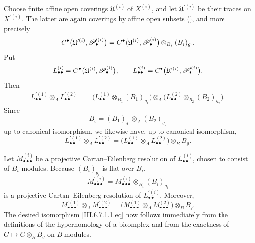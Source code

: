 \begin{env}[6.7.1]

Choose finite affine open coverings $\mathfrak U^{(i)}$ of
$X^{(i)}$, and let $\mathfrak U^{\prime(i)}$ be their traces on
$X^{\prime(i)}$.  The latter are again coverings by affine open
subsets (), and more precisely
\[
  C^\bullet
  \bigl(
    \mathfrak U^{\prime(i)},\mathscr{P}_\bullet^{\prime(i)}
  \bigr)
  =
  C^\bullet
  \bigl(
    \mathfrak U^{(i)},\mathscr{P}_\bullet^{(i)}
  \bigr)
  \otimes_{B_i}(B_i)_{g_i}.
\]
Put
\[
  L_{\bullet\bullet}^{(i)}
  =
  C^\bullet
  \bigl(
    \mathfrak U^{(i)},\mathscr{P}_\bullet^{(i)}
  \bigr),
  \qquad
  L_{\bullet\bullet}^{\prime(i)}
  =
  C^\bullet
  \bigl(
    \mathfrak U^{\prime(i)},\mathscr{P}_\bullet^{\prime(i)}
  \bigr).
\]
Then
\[
\begin{split}
  L_{\bullet\bullet}^{\prime(1)}
  \otimes_A L_{\bullet\bullet}^{\prime(2)}
  &=
  \bigl(
    L_{\bullet\bullet}^{(1)}
    \otimes_{B_1}(B_1)_{g_1}
  \bigr)
  \otimes_A
  \bigl(
    L_{\bullet\bullet}^{(2)}
    \otimes_{B_2}(B_2)_{g_2}
  \bigr).
\end{split}
\]
Since
\[
  B_g=(B_1)_{g_1}\otimes_A(B_2)_{g_2}
\]
up to canonical isomorphism, we likewise have, up to canonical
isomorphism,
\[
  L_{\bullet\bullet}^{\prime(1)}
  \otimes_A L_{\bullet\bullet}^{\prime(2)}
  =
  \bigl(
    L_{\bullet\bullet}^{(1)}
    \otimes_A L_{\bullet\bullet}^{(2)}
  \bigr)
  \otimes_BB_g.
\]

Let $M_{\bullet\bullet\bullet}^{(i)}$ be a projective
Cartan--Eilenberg resolution of $L_{\bullet\bullet}^{(i)}$,
chosen to consist of $B_i$-modules.  Because $(B_i)_{g_i}$ is
flat over $B_i$,
\[
  M_{\bullet\bullet\bullet}^{\prime(i)}
  =
  M_{\bullet\bullet\bullet}^{(i)}
  \otimes_{B_i}(B_i)_{g_i}
\]
is a projective Cartan--Eilenberg resolution of
$L_{\bullet\bullet}^{\prime(i)}$.  Moreover,
\[
  M_{\bullet\bullet\bullet}^{\prime(1)}
  \otimes_A M_{\bullet\bullet\bullet}^{\prime(2)}
  =
  \bigl(
    M_{\bullet\bullet\bullet}^{(1)}
    \otimes_A M_{\bullet\bullet\bullet}^{(2)}
  \bigr)
  \otimes_BB_g.
\]
The desired isomorphism \eqref{III.6.7.1.1.eq} now follows
immediately from the definitions of the hyperhomology of a
bicomplex and from the exactness of
$G\longmapsto G\otimes_BB_g$ on $B$-modules.
\end{env}

